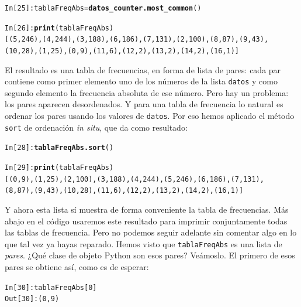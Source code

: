 \documentclass[10pt,a4paper]{article}\usepackage[]{graphicx}\usepackage[]{color}
\makeatletter
\newcommand{\hlkwd}[1]{\textcolor[rgb]{0.737,0.353,0.396}{\textbf{#1}}}%
\newenvironment{kframe}{%
 \def\at@end@of@kframe{}%
 \ifinner\ifhmode%
  \def\at@end@of@kframe{\end{minipage}}%
  \begin{minipage}{\columnwidth}%
 \fi\fi%
 \def\FrameCommand##1{\hskip\@totalleftmargin \hskip-\fboxsep
 \colorbox{shadecolor}{##1}\hskip-\fboxsep
     \hskip-\linewidth \hskip-\@totalleftmargin \hskip\columnwidth}%
 \MakeFramed {\advance\hsize-\width
   \@totalleftmargin\z@ \linewidth\hsize
   \@setminipage}}%
 {\par\unskip\endMakeFramed%
 \at@end@of@kframe}
\newenvironment{knitrout}{}{} %
\newcounter {cont01}
\makeatother
\begin{document}
\begin{knitrout}
\color{fgcolor}\begin{kframe}
\begin{alltt}
In [25]: tablaFreqAbs = \hlkwd{datos_counter.most_common}()

In [26]: \hlkwd{print}(tablaFreqAbs)
[(5, 246), (4, 244), (3, 188), (6, 186), (7, 131), (2, 100), (8, 87), (9, 43),
(10, 28), (1, 25), (0, 9), (11, 6), (12, 2), (13, 2), (14, 2), (16, 1)]
\end{alltt}
\end{kframe}
\end{knitrout}
El resultado es una tabla de frecuencias, en forma de lista de pares: cada par contiene como primer elemento uno de los números de la lista {\tt datos} y como segundo elemento la frecuencia absoluta de ese número. Pero hay un problema: los pares aparecen desordenados. Y para una tabla de frecuencia lo natural es ordenar los pares usando los valores de {\tt datos}. Por eso hemos aplicado el método {\tt sort} de ordenación {\em in situ}, que da como resultado:
\begin{knitrout}
\color{fgcolor}\begin{kframe}
\begin{alltt}
In [28]: \hlkwd{tablaFreqAbs.sort}()

In [29]: \hlkwd{print}(tablaFreqAbs)
[(0, 9), (1, 25), (2, 100), (3, 188), (4, 244), (5, 246), (6, 186), (7, 131),
(8, 87), (9, 43), (10, 28), (11, 6), (12, 2), (13, 2), (14, 2), (16, 1)]
\end{alltt}
\end{kframe}
\end{knitrout}
Y ahora esta  lista sí muestra de forma conveniente la tabla de frecuencias. Más abajo en el código usaremos este resultado para imprimir conjuntamente todas las tablas de frecuencia. Pero no podemos seguir adelante sin comentar algo en lo que tal vez ya hayas reparado. Hemos visto que {\tt tablaFreqAbs} es una lista de {\em pares}. ¿Qué clase de objeto Python son esos pares? Veámoslo. El primero de esos pares se obtiene así, como es de esperar:
\begin{knitrout}
\color{fgcolor}\begin{kframe}
\begin{alltt}
In [30]: tablaFreqAbs[0]
Out[30]: (0, 9)
\end{alltt}
\end{kframe}
\end{knitrout}
\end{document}
